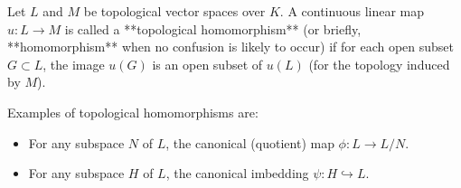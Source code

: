 Let $L$ and $M$ be topological vector spaces over $K$. A continuous linear map $u: L \to M$ is called a **topological homomorphism** (or briefly, **homomorphism** when no confusion is likely to occur) if for each open subset $G \subset L$, the image $u(G)$ is an open subset of $u(L)$ (for the topology induced by $M$).

Examples of topological homomorphisms are:
\begin{itemize}
\item For any subspace $N$ of $L$, the canonical (quotient) map $\phi: L \to L/N$.
\item For any subspace $H$ of $L$, the canonical imbedding $\psi: H \hookrightarrow L$.
\end{itemize}
